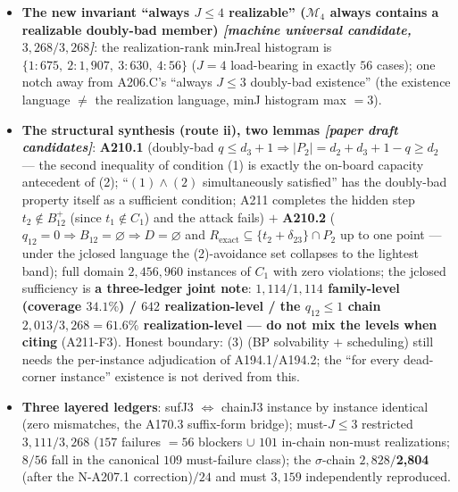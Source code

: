 \begin{itemize}
death $28/56$ (after the A211-F7 correction), $d_3=1$ in $47$ cases (after
the A211-F1 correction) with $d_1\ge4$ dense type, rank-4 spend positions
$l2{:}23$/zero$:8$/l1$:4$/l6$:10$/l3$:11$. \textbf{Closure meaning}: the
chained reading ``(A206.C) $\to$ (A194.1/1$'$) $\to$ scheduling'' breaks at
(1), the language, in these $56$ cases --- ``always $J\le3$ doubly-bad'',
even if proved on paper, gives existence only, not realizable carriers.
\item \textbf{The new invariant ``always $J\le4$ realizable''
($\mathcal{M}_4$ always contains a realizable doubly-bad member)
\emph{[machine universal candidate, $3{,}268/3{,}268$]}}: the
realization-rank minJreal histogram is \textbf{$\{1{:}675,\ 2{:}1{,}907,\
3{:}630,\ 4{:}56\}$} ($J=4$ load-bearing in exactly $56$ cases); one notch
away from A206.C's ``always $J\le3$ doubly-bad existence'' (the existence
language $\ne$ the realization language, minJ histogram max $=3$).
\item \textbf{The structural synthesis (route ii), two lemmas
\emph{[paper draft candidates]}}: \textbf{A210.1} (doubly-bad
$q\le d_3+1\Rightarrow\lvert P_2\rvert=d_2+d_3+1-q\ge d_2$ --- the second
inequality of condition (1) is exactly the on-board capacity antecedent of
(2); ``$(1)\wedge(2)$ simultaneously satisfied'' has the doubly-bad property
itself as a sufficient condition; A211 completes the hidden step
$t_2\notin B_{12}^+$ (since $t_1\notin C_1$) and the attack fails) $+$
\textbf{A210.2} ($q_{12}=0\Rightarrow B_{12}=\varnothing\Rightarrow
D=\varnothing$ and $R_\mathrm{exact}\subseteq\{t_2+\delta_{23}\}\cap P_2$
up to one point --- under the jclosed language the (2)-avoidance set
collapses to the lightest band); full domain $2{,}456{,}960$ instances of
$C_1$ with zero violations; the jclosed sufficiency is \textbf{a
three-ledger joint note}: \textbf{$1{,}114/1{,}114$ family-level (coverage
$34.1\%$) / $642$ realization-level / the $q_{12}\le1$ chain
$2{,}013/3{,}268=61.6\%$ realization-level --- do not mix the levels when
citing} (A211-F3). Honest boundary: (3) (BP solvability $+$ scheduling)
still needs the per-instance adjudication of A194.1/A194.2; the
``for every dead-corner instance'' existence is not derived from this.
\item \textbf{Three layered ledgers}: sufJ3 $\iff$ chainJ3 instance by
instance identical (zero mismatches, the A170.3 suffix-form bridge);
must-$J\le3$ restricted $3{,}111/3{,}268$ ($157$ failures $=56$ blockers
$\cup$ $101$ in-chain non-must realizations; $8/56$ fall in the canonical
$109$ must-failure class); the $\sigma$-chain $2{,}828/$\textbf{2,804}
(after the N-A207.1 correction)$/24$ and must $3{,}159$ independently
reproduced.
\end{itemize}

